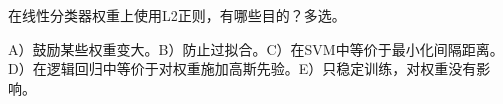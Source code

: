 在线性分类器权重上使用L2正则，有哪些目的？多选。


A）鼓励某些权重变大。B）防止过拟合。C）在SVM中等价于最小化间隔距离。D）在逻辑回归中等价于对权重施加高斯先验。E）只稳定训练，对权重没有影响。
